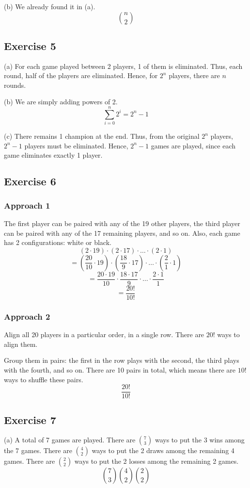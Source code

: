 \documentclass{book}
\begin{document}
\noindent
(b) We already found it in (a).
$$\binom{n}{2}$$

\subsection*{Exercise 5}
(a) For each game played between 2 players, 1 of them is eliminated. Thus, each round, half of the players are eliminated. Hence, for $2^n$ players, there are $n$ rounds.

\noindent
(b) We are simply adding powers of 2.
$$\sum_{i = 0}^{n} 2^i = 2^n - 1$$

\noindent
(c) There remains 1 champion at the end. Thus, from the original $2^n$ players, $2^n - 1$ players must be eliminated. Hence, $2^n - 1$ games are played, since each game eliminates exactly 1 player.

\subsection*{Exercise 6}

\subsubsection*{Approach 1}
The first player can be paired with any of the 19 other players, the third player can be paired with any of the 17 remaining players, and so on. Also, each game has 2 configurations: white or black.
$$(2 \cdot 19) \cdot (2 \cdot 17) \cdot \ldots \cdot (2 \cdot 1)$$
$$= (\frac{20}{10} \cdot 19) \cdot (\frac{18}{9} \cdot 17) \cdot \ldots \cdot (\frac{2}{1} \cdot 1)$$
$$= \frac{20 \cdot 19}{10} \cdot \frac{18 \cdot 17}{9} \cdot \ldots \cdot \frac{2 \cdot 1}{1}$$
$$= \frac{20!}{10!}$$

\subsubsection*{Approach 2}
Align all 20 players in a particular order, in a single row. There are $20!$ ways to align them.

Group them in pairs: the first in the row plays with the second, the third plays with the fourth, and so on. There are 10 pairs in total, which means there are $10!$ ways to shuffle these pairs.
$$\frac{20!}{10!}$$

\subsection*{Exercise 7}
(a) A total of 7 games are played. There are $\binom{7}{3}$ ways to put the 3 wins among the 7 games. There are $\binom{4}{2}$ ways to put the 2 draws among the remaining 4 games. There are $\binom{2}{2}$ ways to put the 2 losses among the remaining 2 games.
$$\binom{7}{3} \binom{4}{2} \binom{2}{2}$$
\end{document}

